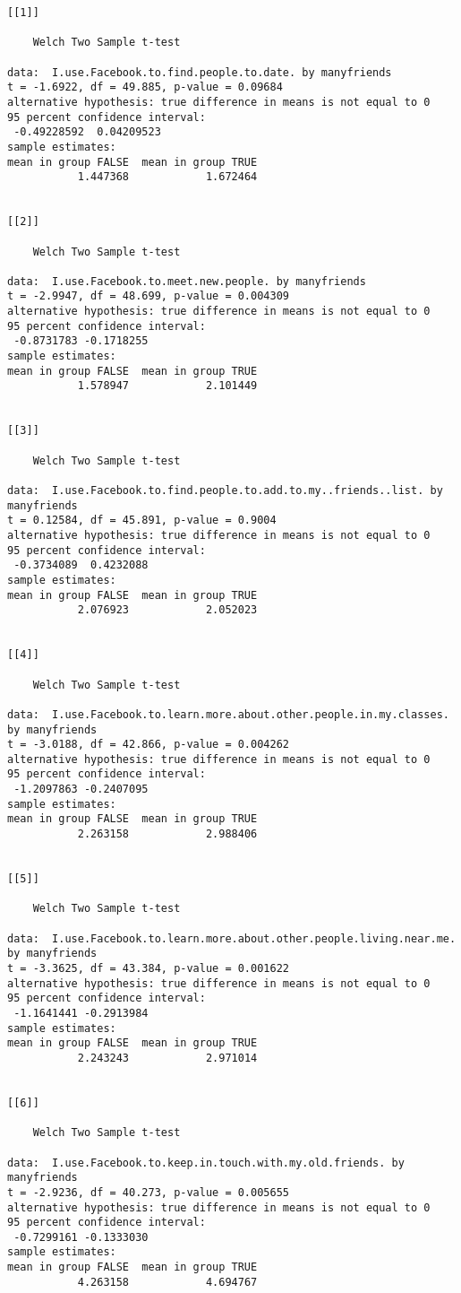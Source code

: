 \documentclass[11pt]{article}
\begin{document}
    
    \begin{verbatim}
[[1]]

	Welch Two Sample t-test

data:  I.use.Facebook.to.find.people.to.date. by manyfriends
t = -1.6922, df = 49.885, p-value = 0.09684
alternative hypothesis: true difference in means is not equal to 0
95 percent confidence interval:
 -0.49228592  0.04209523
sample estimates:
mean in group FALSE  mean in group TRUE 
           1.447368            1.672464 


[[2]]

	Welch Two Sample t-test

data:  I.use.Facebook.to.meet.new.people. by manyfriends
t = -2.9947, df = 48.699, p-value = 0.004309
alternative hypothesis: true difference in means is not equal to 0
95 percent confidence interval:
 -0.8731783 -0.1718255
sample estimates:
mean in group FALSE  mean in group TRUE 
           1.578947            2.101449 


[[3]]

	Welch Two Sample t-test

data:  I.use.Facebook.to.find.people.to.add.to.my..friends..list. by manyfriends
t = 0.12584, df = 45.891, p-value = 0.9004
alternative hypothesis: true difference in means is not equal to 0
95 percent confidence interval:
 -0.3734089  0.4232088
sample estimates:
mean in group FALSE  mean in group TRUE 
           2.076923            2.052023 


[[4]]

	Welch Two Sample t-test

data:  I.use.Facebook.to.learn.more.about.other.people.in.my.classes. by manyfriends
t = -3.0188, df = 42.866, p-value = 0.004262
alternative hypothesis: true difference in means is not equal to 0
95 percent confidence interval:
 -1.2097863 -0.2407095
sample estimates:
mean in group FALSE  mean in group TRUE 
           2.263158            2.988406 


[[5]]

	Welch Two Sample t-test

data:  I.use.Facebook.to.learn.more.about.other.people.living.near.me. by manyfriends
t = -3.3625, df = 43.384, p-value = 0.001622
alternative hypothesis: true difference in means is not equal to 0
95 percent confidence interval:
 -1.1641441 -0.2913984
sample estimates:
mean in group FALSE  mean in group TRUE 
           2.243243            2.971014 


[[6]]

	Welch Two Sample t-test

data:  I.use.Facebook.to.keep.in.touch.with.my.old.friends. by manyfriends
t = -2.9236, df = 40.273, p-value = 0.005655
alternative hypothesis: true difference in means is not equal to 0
95 percent confidence interval:
 -0.7299161 -0.1333030
sample estimates:
mean in group FALSE  mean in group TRUE 
           4.263158            4.694767 


    \end{verbatim}
\end{document}
